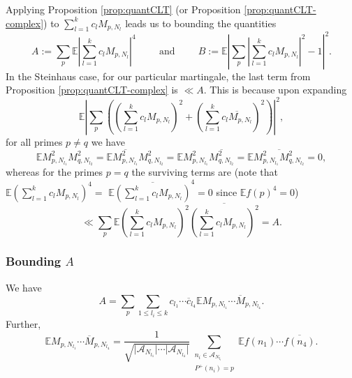\documentclass[11pt]{tran-l}
\theoremstyle{definition}
\theoremstyle{remark}
\numberwithin{equation}{section}
\begin{document}
Applying Proposition \ref{prop:quantCLT} (or Proposition \ref{prop:quantCLT-complex}) to $\sum_{l=1}^k c_lM_{p, N_l}$ leads us to bounding the quantities 
\begin{equation*}
    A := \sum_{p} \mathbb E\left\lvert\sum_{l=1}^k c_lM_{p, N_l}\right\rvert^4 \hspace{1cm}\text{and}\hspace{1cm} B:= \mathbb E\left\lvert\sum_{p} \left\lvert \sum_{l=1}^k c_lM_{p, N_l}\right\rvert^2 - 1\right\rvert^2.
\end{equation*}
In the Steinhaus case, for our particular martingale, the last term from Proposition \ref{prop:quantCLT-complex} is $\ll A$. This is because upon expanding
\begin{equation*}
    \mathbb E \left\lvert\sum_p \left(\left(\sum_{l=1}^k c_lM_{p, N_l}\right)^2 + \left(\sum_{l=1}^k \overline{c_lM_{p, N_l}}\right)^2\right) \right\rvert^2,
\end{equation*}
for all primes $p\neq q$ we have $$\mathbb EM_{p, N_{l_1}}^2M_{q, N_{l_2}}^2=\mathbb E\overline{M_{p, N_{l_1}}^2}M_{q, N_{l_2}}^2 = \mathbb EM_{p, N_{l_1}}^2\overline{M_{q, N_{l_2}}^2} = \mathbb E\overline{M_{p, N_{l_1}}^2M_{q, N_{l_2}}^2}=0,$$ whereas for the primes $p=q$ the surviving terms are (note that $\mathbb E\left(\sum_{l=1}^k c_l M_{p, N_l}\right)^4 =$ \linebreak $\mathbb E\overline{\left(\sum_{l=1}^k c_l M_{p, N_l}\right)}^4 =  0$ since $\mathbb Ef(p)^4 = 0$)
\begin{equation*}
    \ll \sum_{p} \mathbb E\left(\sum_{l=1}^k c_lM_{p, N_l}\right)^2\overline{\left(\sum_{l=1}^k c_l M_{p, N_l}\right)^2} = A.
\end{equation*}

\subsubsection{Bounding $A$} We have
\begin{equation*}
    A = \sum_p\sum_{1\leq l_i\leq k} c_{l_1}\cdots \overline{c}_{l_4}\mathbb E M_{p, N_{l_1}}\cdots \overline{M}_{p, N_{l_4}}. 
\end{equation*}
Further, 
\begin{equation*}
    \mathbb E M_{p, N_{l_1}}\cdots \overline{M}_{p, N_{l_4}} = \frac{1}{\sqrt{\lvert \mathcal A_{N_{l_1}}\rvert\cdots \lvert \mathcal A_{N_{l_4}}\rvert}}\sum_{\substack{n_i\in\mathcal A_{N_{l_i}} \\ P^+(n_i) = p}} \mathbb Ef(n_1)\cdots \overline{f(n_4)}.
\end{equation*}
\end{document}
